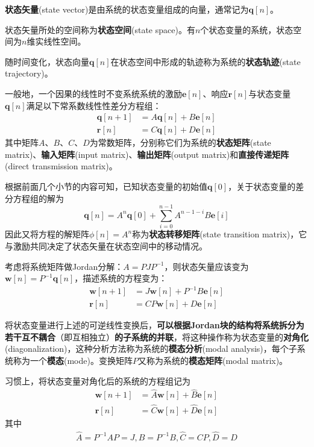 \begin{definition}[状态矢量]
    \textbf{状态矢量}(state vector)是由系统的状态变量组成的向量，通常记为$\mathbf{q}[n]$。
\end{definition}
    
\begin{definition}[状态空间和状态轨迹]
    状态矢量所处的空间称为\textbf{状态空间}(state space)。有$n$个状态变量的系统，状态空间为$n$维实线性空间。
    
    随时间变化，状态向量$\mathbf{q}[n]$在状态空间中形成的轨迹称为系统的\textbf{状态轨迹}(state trajectory)。
\end{definition}

一般地，一个因果的线性时不变系统系统的激励$\mathbf{e}[n]$、响应$\mathbf{r}[n]$与状态变量$\mathbf{q}[n]$满足以下常系数线性性差分方程组：
\begin{align*}
    \mathbf{q}[n+1]&=A\mathbf{q}[n]+B\mathbf{e}[n]\\
    \mathbf{r}[n]&=C\mathbf{q}[n]+D\mathbf{e}[n]
\end{align*}
其中矩阵$A$、$B$、$C$、$D$为常数矩阵，分别称它们为系统的\textbf{状态矩阵}(state matrix)、\textbf{输入矩阵}(input matrix)、\textbf{输出矩阵}(output matrix)和\textbf{直接传递矩阵}(direct transmission matrix)。

根据前面几个小节的内容可知，已知状态变量的初始值$\mathbf{q}[0]$，关于状态变量的差分方程组的解为
$$\mathbf{q}[n]=A^n\mathbf{q}[0]+\sum_{i=0}^{n-1}A^{n-1-i}B\mathbf{e}[i]$$
因此又将方程的解矩阵$\phi[n]=A^n$称为\textbf{状态转移矩阵}(state transition matrix)，它与激励共同决定了状态矢量在状态空间中的移动情况。

考虑将系统矩阵做Jordan分解：$A=PJP^{-1}$，则状态矢量应该变为$\mathbf{w}[n]=P^{-1}\mathbf{q}[n]$，描述系统的方程变为：\begin{align*}
    \mathbf{w}[n+1]&=J\mathbf{w}[n]+P^{-1}B\mathbf{e}[n]\\
    \mathbf{r}[n]&=CP\mathbf{w}[n]+D\mathbf{e}[n]
\end{align*}

将状态变量进行上述的可逆线性变换后，\textbf{可以根据Jordan块的结构将系统拆分为若干互不耦合}（即互相独立）\textbf{的子系统的并联}，将这种操作称为状态变量的\textbf{对角化}(diagonalization)，这种分析方法称为系统的\textbf{模态分析}(modal analysis)，每个子系统称为一个\textbf{模态}(mode)。变换矩阵$P$又称为系统的\textbf{模态矩阵}(modal matrix)。

习惯上，将状态变量对角化后的系统的方程组记为\begin{align*}
    \mathbf{w}[n+1]&=\hat{A}\mathbf{w}[n]+\hat{B}\mathbf{e}[n]\\
    \mathbf{r}[n]&=\hat{C}\mathbf{w}[n]+\hat{D}\mathbf{e}[n]
\end{align*}
其中\begin{align*}
    \hat{A}=P^{-1}AP=J,\hat{B}=P^{-1}B,\hat{C}=CP,\hat{D}=D
\end{align*}

